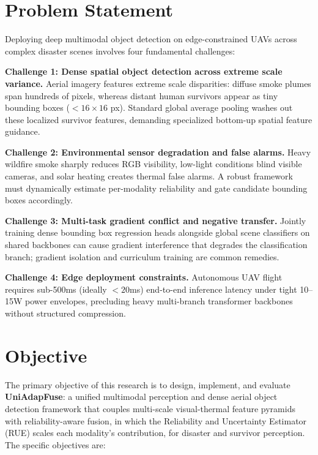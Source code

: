 \section{Problem Statement}

Deploying deep multimodal object detection on edge-constrained UAVs across complex disaster scenes involves four fundamental challenges:

\textbf{Challenge 1: Dense spatial object detection across extreme scale variance.} Aerial imagery features extreme scale disparities: diffuse smoke plumes span hundreds of pixels, whereas distant human survivors appear as tiny bounding boxes ($<16\times16$ px). Standard global average pooling washes out these localized survivor features, demanding specialized bottom-up spatial feature guidance.

\textbf{Challenge 2: Environmental sensor degradation and false alarms.} Heavy wildfire smoke sharply reduces RGB visibility, low-light conditions blind visible cameras, and solar heating creates thermal false alarms. A robust framework must dynamically estimate per-modality reliability and gate candidate bounding boxes accordingly.

\textbf{Challenge 3: Multi-task gradient conflict and negative transfer.} Jointly training dense bounding box regression heads alongside global scene classifiers on shared backbones can cause gradient interference that degrades the classification branch; gradient isolation and curriculum training are common remedies.

\textbf{Challenge 4: Edge deployment constraints.} Autonomous UAV flight requires sub-500ms (ideally $<20$ms) end-to-end inference latency under tight 10--15W power envelopes, precluding heavy multi-branch transformer backbones without structured compression.

\section{Objective}

The primary objective of this research is to design, implement, and evaluate \textbf{UniAdapFuse}: a unified multimodal perception and dense aerial object detection framework that couples multi-scale visual-thermal feature pyramids with reliability-aware fusion, in which the Reliability and Uncertainty Estimator (RUE) scales each modality's contribution, for disaster and survivor perception. The specific objectives are:

